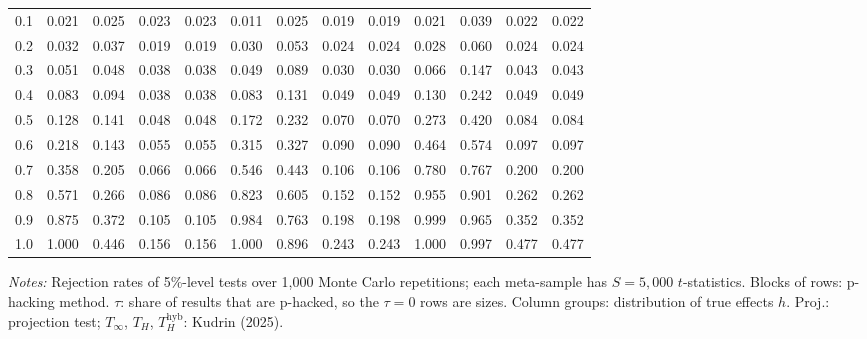 \begin{table}[htbp]
\begin{tabular}{lcccccccccccc}
0.1 & 0.021 & 0.025 & 0.023 & 0.023 & 0.011 & 0.025 & 0.019 & 0.019 & 0.021 & 0.039 & 0.022 & 0.022 \\
0.2 & 0.032 & 0.037 & 0.019 & 0.019 & 0.030 & 0.053 & 0.024 & 0.024 & 0.028 & 0.060 & 0.024 & 0.024 \\
0.3 & 0.051 & 0.048 & 0.038 & 0.038 & 0.049 & 0.089 & 0.030 & 0.030 & 0.066 & 0.147 & 0.043 & 0.043 \\
0.4 & 0.083 & 0.094 & 0.038 & 0.038 & 0.083 & 0.131 & 0.049 & 0.049 & 0.130 & 0.242 & 0.049 & 0.049 \\
0.5 & 0.128 & 0.141 & 0.048 & 0.048 & 0.172 & 0.232 & 0.070 & 0.070 & 0.273 & 0.420 & 0.084 & 0.084 \\
0.6 & 0.218 & 0.143 & 0.055 & 0.055 & 0.315 & 0.327 & 0.090 & 0.090 & 0.464 & 0.574 & 0.097 & 0.097 \\
0.7 & 0.358 & 0.205 & 0.066 & 0.066 & 0.546 & 0.443 & 0.106 & 0.106 & 0.780 & 0.767 & 0.200 & 0.200 \\
0.8 & 0.571 & 0.266 & 0.086 & 0.086 & 0.823 & 0.605 & 0.152 & 0.152 & 0.955 & 0.901 & 0.262 & 0.262 \\
0.9 & 0.875 & 0.372 & 0.105 & 0.105 & 0.984 & 0.763 & 0.198 & 0.198 & 0.999 & 0.965 & 0.352 & 0.352 \\
1.0 & 1.000 & 0.446 & 0.156 & 0.156 & 1.000 & 0.896 & 0.243 & 0.243 & 1.000 & 0.997 & 0.477 & 0.477 \\
\bottomrule
\end{tabular}
\par\smallskip
\begin{minipage}{\linewidth}\footnotesize\textit{Notes:} Rejection rates of 5\%-level tests over 1,000 Monte Carlo repetitions; each meta-sample has $S = 5{,}000$ $t$-statistics. Blocks of rows: p-hacking method. $\tau$: share of results that are p-hacked, so the $\tau = 0$ rows are sizes. Column groups: distribution of true effects $h$. Proj.: projection test; $T_\infty$, $T_H$, $T_H^{\mathrm{hyb}}$: Kudrin (2025).\end{minipage}
\end{table}
